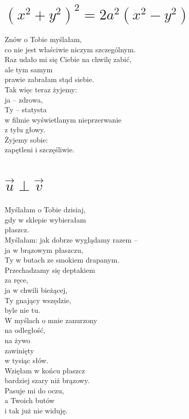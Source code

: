 \documentclass[12pt, a4paper]{memoir}
\renewenvironment{verse}{%
  \par\vspace{\baselineskip}\raggedright
}{
  \par\vspace{\baselineskip}
}
\begin{document}
\newpage
\section[Lemniskata Bernoulliego]{$(x^2 + y^2)^2 = 2a^2(x^2 - y^2)$}
\begin{verse}
Znów o Tobie myślałam,\\
co nie jest właściwie niczym szczególnym.\\[\baselineskip]

Raz udało mi się Ciebie na chwilę zabić,\\
ale tym samym\\
prawie zabrałam stąd siebie.\\[\baselineskip]

Tak więc teraz żyjemy:\\
ja -- zdrowa,\\
Ty -- statysta\\
w filmie wyświetlanym nieprzerwanie\\
z tyłu głowy.\\[\baselineskip]

Żyjemy sobie:\\
zapętleni i szczęśliwie.
\end{verse}

\newpage
\section[Wektory prostopadłe]{%
    $\vec{u} \perp \vec{v}$%
}
\begin{verse}
Myślałam o Tobie dzisiaj,\\
gdy w sklepie wybierałam\\
płaszcz.\\
Myślałam: jak dobrze wyglądamy razem --\\
ja w brązowym płaszczu,\\
Ty w butach ze smokiem drapanym.\\
Przechadzamy się deptakiem\\
za ręce,\\
ja w chwili bieżącej,\\
Ty gnający wszędzie,\\
byle nie tu.\\
W myślach o mnie zanurzony\\
na odległość,\\
na żywo\\
zawinięty\\
w tysiąc słów.\\[\baselineskip]

Wzięłam w końcu płaszcz \\
bardziej szary niż brązowy.\\
Pasuje mi do oczu,\\
a Twoich butów\\
i tak już nie widuję.
\end{verse}
\end{document}
